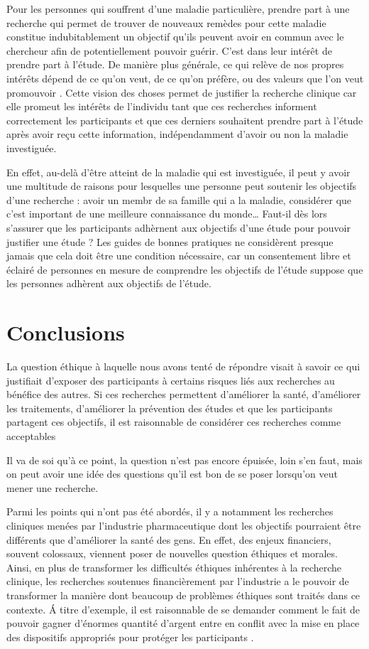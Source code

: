 \documentclass[
  12pt,
]{book}
\begin{document}
Pour les personnes qui souffrent d'une maladie particulière, prendre part à une recherche qui permet de trouver de nouveaux remèdes pour cette maladie constitue indubitablement un objectif qu'ils peuvent avoir en commun avec le chercheur afin de potentiellement pouvoir guérir. C'est dans leur intérêt de prendre part à l'étude. De manière plus générale, ce qui relève de nos propres intérêts dépend de ce qu'on veut, de ce qu'on préfère, ou des valeurs que l'on veut promouvoir \citep{Griffin1988}. Cette vision des choses permet de justifier la recherche clinique car elle promeut les intérêts de l'individu tant que ces recherches informent correctement les participants et que ces derniers souhaitent prendre part à l'étude après avoir reçu cette information, indépendamment d'avoir ou non la maladie investiguée.

En effet, au-delà d'être atteint de la maladie qui est investiguée, il peut y avoir une multitude de raisons pour lesquelles une personne peut soutenir les objectifs d'une recherche : avoir un membr de sa famille qui a la maladie, considérer que c'est important de une meilleure connaissance du monde\ldots{} Faut-il dès lors s'assurer que les participants adhèrnent aux objectifs d'une étude pour pouvoir justifier une étude ? Les guides de bonnes pratiques ne considèrent presque jamais que cela doit être une condition nécessaire, car un consentement libre et éclairé de personnes en mesure de comprendre les objectifs de l'étude suppose que les personnes adhèrent aux objectifs de l'étude.

\chapter{Conclusions}\label{conclusions}

La question éthique à laquelle nous avons tenté de répondre visait à savoir ce qui justifiait d'exposer des participants à certains risques liés aux recherches au bénéfice des autres. Si ces recherches permettent d'améliorer la santé, d'améliorer les traitements, d'améliorer la prévention des études et que les participants partagent ces objectifs, il est raisonnable de considérer ces recherches comme acceptables

Il va de soi qu'à ce point, la question n'est pas encore épuisée, loin s'en faut, mais on peut avoir une idée des questions qu'il est bon de se poser lorsqu'on veut mener une recherche.

Parmi les points qui n'ont pas été abordés, il y a notamment les recherches cliniques menées par l'industrie pharmaceutique dont les objectifs pourraient être différents que d'améliorer la santé des gens. En effet, des enjeux financiers, souvent colossaux, viennent poser de nouvelles question éthiques et morales. Ainsi, en plus de transformer les difficultés éthiques inhérentes à la recherche clinique, les recherches soutenues financièrement par l'industrie a le pouvoir de transformer la manière dont beaucoup de problèmes éthiques sont traités dans ce contexte. Á titre d'exemple, il est raisonnable de se demander comment le fait de pouvoir gagner d'énormes quantité d'argent entre en conflit avec la mise en place des dispositifs appropriés pour protéger les participants \citep{Fontanarosa2005}.
\end{document}
